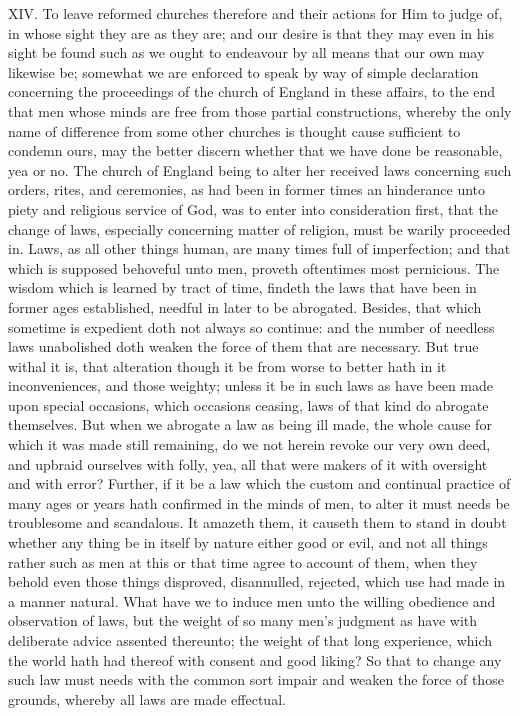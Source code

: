 XIV. To leave reformed churches therefore and their actions for Him to judge of, in whose sight they are as they are; and our desire is that they may even in his sight be found such as we ought to endeavour by all means that our own may likewise be; somewhat we are enforced to speak by way of simple declaration concerning the proceedings of the church of England in these affairs, to the end that men whose minds are free from those partial constructions, whereby the only name of difference from some other churches is thought cause sufficient to condemn ours, may the better discern whether that we have done be reasonable, yea or no. The church of England being to alter her received laws concerning such orders, rites, and ceremonies, as had been in former times an hinderance unto piety and religious service of God, was to enter into consideration first, that the change of laws, especially concerning matter of religion, must be warily proceeded in. Laws, as all other things human, are many times full of imperfection; and that which is supposed behoveful unto men, proveth oftentimes most pernicious. The wisdom which is  learned by tract of time, findeth the laws that have been in former ages established, needful in later to be abrogated. Besides, that which sometime is expedient doth not always so continue: and the number of needless laws unabolished doth weaken the force of them that are necessary. But true withal it is, that alteration though it be from worse to better hath in it inconveniences, and those weighty; unless it be in such laws as have been made upon special occasions, which occasions ceasing, laws of that kind do abrogate themselves. But when we abrogate a law as being ill made, the whole cause for which it was made still remaining, do we not herein revoke our very own deed, and upbraid ourselves with folly, yea, all that were makers of it with oversight and with error? Further, if it be a law which the custom and continual practice of many ages or years hath confirmed in the minds of men, to alter it must needs be troublesome and scandalous. It amazeth them, it causeth them to stand in doubt whether any thing be in itself by nature either good or evil, and not all things rather such as men at this or that time agree to account of them, when they behold even those things disproved, disannulled, rejected, which use had made in a manner natural. What have we to induce men unto the willing obedience and observation of laws, but the weight of so many men’s judgment as have with deliberate advice assented thereunto; the weight of that long experience, which the world hath had thereof with consent and good liking? So that to change any such law must needs with the common sort impair and weaken the force of those grounds, whereby all laws are made effectual.

